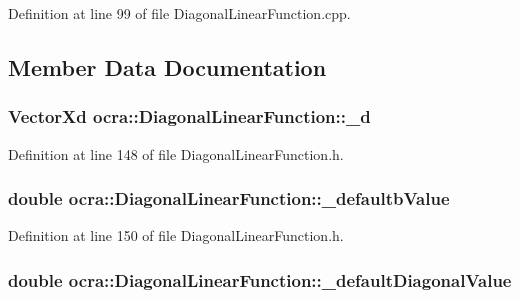 Definition at line 99 of file Diagonal\+Linear\+Function.\+cpp.



\subsection{Member Data Documentation}
\subsubsection[{\texorpdfstring{\+\_\+d}{_d}}]{\setlength{\rightskip}{0pt plus 5cm}Vector\+Xd ocra\+::\+Diagonal\+Linear\+Function\+::\+\_\+d\hspace{0.3cm}{\ttfamily [protected]}}\hypertarget{classocra_1_1DiagonalLinearFunction_adf9d157af394f4322d71720bea545f00}{}\label{classocra_1_1DiagonalLinearFunction_adf9d157af394f4322d71720bea545f00}


Definition at line 148 of file Diagonal\+Linear\+Function.\+h.

\subsubsection[{\texorpdfstring{\+\_\+defaultb\+Value}{_defaultbValue}}]{\setlength{\rightskip}{0pt plus 5cm}double ocra\+::\+Diagonal\+Linear\+Function\+::\+\_\+defaultb\+Value\hspace{0.3cm}{\ttfamily [protected]}}\hypertarget{classocra_1_1DiagonalLinearFunction_ab004421a9f01bd2c3fa5b97b7532c6c2}{}\label{classocra_1_1DiagonalLinearFunction_ab004421a9f01bd2c3fa5b97b7532c6c2}


Definition at line 150 of file Diagonal\+Linear\+Function.\+h.

\subsubsection[{\texorpdfstring{\+\_\+default\+Diagonal\+Value}{_defaultDiagonalValue}}]{\setlength{\rightskip}{0pt plus 5cm}double ocra\+::\+Diagonal\+Linear\+Function\+::\+\_\+default\+Diagonal\+Value\hspace{0.3cm}{\ttfamily [protected]}}\hypertarget{classocra_1_1DiagonalLinearFunction_aa7150368fce9c7c6c3724b801f498749}{}\label{classocra_1_1DiagonalLinearFunction_aa7150368fce9c7c6c3724b801f498749}


